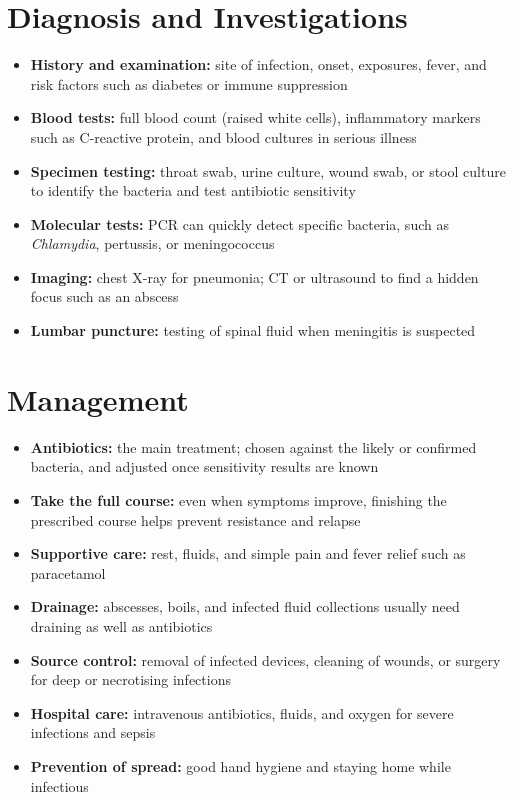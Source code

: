 \section*{Diagnosis and Investigations}
\begin{itemize}
    \item \textbf{History and examination:} site of infection, onset, exposures, fever, and risk factors such as diabetes or immune suppression
    \item \textbf{Blood tests:} full blood count (raised white cells), inflammatory markers such as C-reactive protein, and blood cultures in serious illness
    \item \textbf{Specimen testing:} throat swab, urine culture, wound swab, or stool culture to identify the bacteria and test antibiotic sensitivity
    \item \textbf{Molecular tests:} PCR can quickly detect specific bacteria, such as \textit{Chlamydia}, pertussis, or meningococcus
    \item \textbf{Imaging:} chest X-ray for pneumonia; CT or ultrasound to find a hidden focus such as an abscess
    \item \textbf{Lumbar puncture:} testing of spinal fluid when meningitis is suspected
\end{itemize}

\section*{Management}
\begin{itemize}
    \item \textbf{Antibiotics:} the main treatment; chosen against the likely or confirmed bacteria, and adjusted once sensitivity results are known
    \item \textbf{Take the full course:} even when symptoms improve, finishing the prescribed course helps prevent resistance and relapse
    \item \textbf{Supportive care:} rest, fluids, and simple pain and fever relief such as paracetamol
    \item \textbf{Drainage:} abscesses, boils, and infected fluid collections usually need draining as well as antibiotics
    \item \textbf{Source control:} removal of infected devices, cleaning of wounds, or surgery for deep or necrotising infections
    \item \textbf{Hospital care:} intravenous antibiotics, fluids, and oxygen for severe infections and sepsis
    \item \textbf{Prevention of spread:} good hand hygiene and staying home while infectious
\end{itemize}

